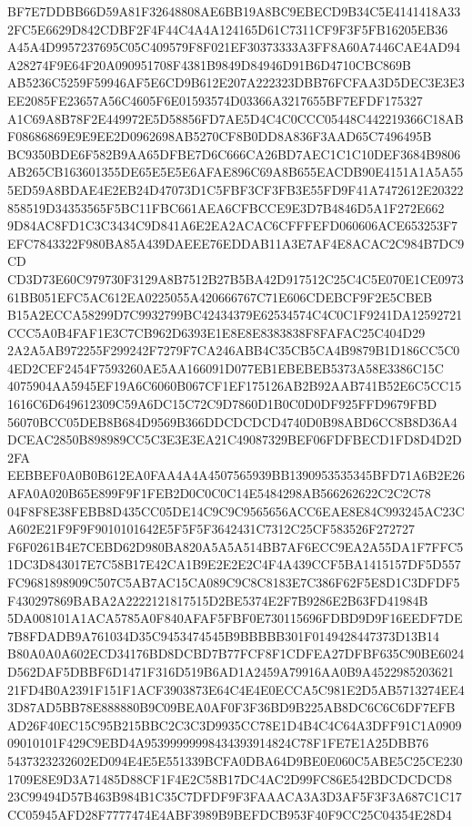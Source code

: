 \documentclass[UTF8,fontset=fandol,zihao=-4,a4paper]{ctexart}
\begin{document}
{{BF7E7DDBB66D59A81F32648808AE6BB19A8BC9EBECD9B34C5E4141418A332FC5E6629D842CDBF2F4F44C4A4A124165D61C7311CF9F3F5FB16205EB36
A45A4D9957237695C05C409579F8F021EF30373333A3FF8A60A7446CAE4AD94A28274F9E64F20A090951708F4381B9849D84946D91B6D4710CBC869B
AB5236C5259F59946AF5E6CD9B612E207A222323DBB76FCFAA3D5DEC3E3E3EE2085FE23657A56C4605F6E01593574D03366A3217655BF7EFDF175327
A1C69A8B78F2E449972E5D58856FD7AE5D4C4C0CCC05448C442219366C18ABF08686869E9E9EE2D0962698AB5270CF8B0DD8A836F3AAD65C7496495B
BC9350BDE6F582B9AA65DFBE7D6C666CA26BD7AEC1C1C10DEF3684B9806AB265CB163601355DE65E5E5E6AFAE896C69A8B655EACDB90E4151A1A5A55
5ED59A8BDAE4E2EB24D47073D1C5FBF3CF3FB3E55FD9F41A7472612E20322858519D34353565F5BC11FBC661AEA6CFBCCE9E3D7B4846D5A1F272E662
9D84AC8FD1C3C3434C9D841A6E2EA2ACAC6CFFFEFD060606ACE653253F7EFC7843322F980BA85A439DAEEE76EDDAB11A3E7AF4E8ACAC2C984B7DC9CD
CD3D73E60C979730F3129A8B7512B27B5BA42D917512C25C4C5E070E1CE097361BB051EFC5AC612EA0225055A420666767C71E606CDEBCF9F2E5CBEB
B15A2ECCA58299D7C9932799BC42434379E62534574C4C0C1F9241DA12592721CCC5A0B4FAF1E3C7CB962D6393E1E8E8E8383838F8FAFAC25C404D29
2A2A5AB972255F299242F7279F7CA246ABB4C35CB5CA4B9879B1D186CC5C04ED2CEF2454F7593260AE5AA166091D077EB1EBEBEB5373A58E3386C15C
4075904AA5945EF19A6C6060B067CF1EF175126AB2B92AAB741B52E6C5CC151616C6D649612309C59A6DC15C72C9D7860D1B0C0D0DF925FFD9679FBD
56070BCC05DEB8B684D9569B366DDCDCDCD4740D0B98ABD6CC8B8D36A4DCEAC2850B898989CC5C3E3E3EA21C49087329BEF06FDFBECD1FD8D4D2D2FA
EEBBEF0A0B0B612EA0FAA4A4A4507565939BB1390953535345BFD71A6B2E26AFA0A020B65E899F9F1FEB2D0C0C0C14E5484298AB566262622C2C2C78
04F8F8E38FEBB8D435CC05DE14C9C9C9565656ACC6EAE8E84C993245AC23CA602E21F9F9F9010101642E5F5F5F3642431C7312C25CF583526F272727
F6F0261B4E7CEBD62D980BA820A5A5A514BB7AF6ECC9EA2A55DA1F7FFC51DC3D843017E7C58B17E42CA1B9E2E2E2C4F4A439CCF5BA1415157DF5D557
FC9681898909C507C5AB7AC15CA089C9C8C8183E7C386F62F5E8D1C3DFDF5F430297869BABA2A2222121817515D2BE5374E2F7B9286E2B63FD41984B
5DA008101A1ACA5785A0F840AFAF5FBF0E730115696FDBD9D9F16EEDF7DE7B8FDADB9A761034D35C9453474545B9BBBBB301F0149428447373D13B14
B80A0A0A602ECD34176BD8DCBD7B77FCF8F1CDFEA27DFBF635C90BE6024D562DAF5DBBF6D1471F316D519B6AD1A2459A79916AA0B9A4522985203621
21FD4B0A2391F151F1ACF3903873E64C4E4E0ECCA5C981E2D5AB5713274EE43D87AD5BB78E888880B9C09BEA0AF0F3F36BD9B225AB8DC6C6C6DF7EFB
AD26F40EC15C95B215BBC2C3C3D9935CC78E1D4B4C4C64A3DFF91C1A090909010101F429C9EBD4A95399999998434393914824C78F1FE7E1A25DBB76
5437323232602ED094E4E5E551339BCFA0DBA64D9BE0E060C5ABE5C25CE2301709E8E9D3A71485D88CF1F4E2C58B17DC4AC2D99FC86E542BDCDCDCD8
23C99494D57B463B984B1C35C7DFDF9F3FAAACA3A3D3AF5F3F3A687C1C17CC05945AFD28F7777474E4ABF3989B9BEFDCB953F40F9CC25C04354E28D4
}}
\end{document}
